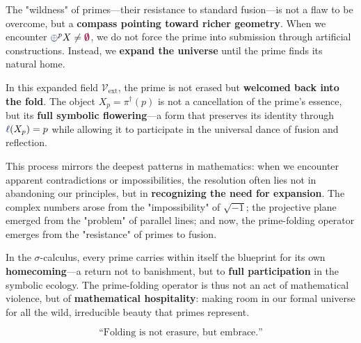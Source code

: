 The "wildness" of primes—their resistance to standard fusion—is not a flaw to be overcome, but a \textbf{compass pointing toward richer geometry}. When we encounter $\fuse^p X \neq \void$, we do not force the prime into submission through artificial constructions. Instead, we \textbf{expand the universe} until the prime finds its natural home.

In this expanded field $\mathcal{V}_{\text{ext}}$, the prime is not erased but \textbf{welcomed back into the fold}. The object $X_p = \pi^\dagger(p)$ is not a cancellation of the prime's essence, but its \textbf{full symbolic flowering}—a form that preserves its identity through $\lha(X_p) = p$ while allowing it to participate in the universal dance of fusion and reflection.

This process mirrors the deepest patterns in mathematics: when we encounter apparent contradictions or impossibilities, the resolution often lies not in abandoning our principles, but in \textbf{recognizing the need for expansion}. The complex numbers arose from the "impossibility" of $\sqrt{-1}$; the projective plane emerged from the "problem" of parallel lines; and now, the prime-folding operator emerges from the "resistance" of primes to fusion.

In the $\sigma$-calculus, every prime carries within itself the blueprint for its own \textbf{homecoming}—a return not to banishment, but to \textbf{full participation} in the symbolic ecology. The prime-folding operator is thus not an act of mathematical violence, but of \textbf{mathematical hospitality}: making room in our formal universe for all the wild, irreducible beauty that primes represent.

\[ \text{``Folding is not erasure, but embrace.''} \] 